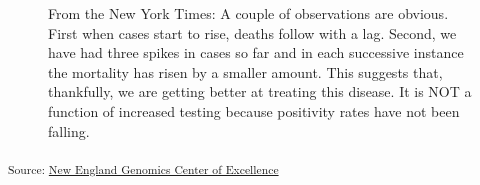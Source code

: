 \documentclass[
  twocolumn]{article}
\begin{document}
\begin{figure}[H]


\caption{\label{fig-state-analysis}From the New York Times: A couple of
observations are obvious. First when cases start to rise, deaths follow
with a lag. Second, we have had three spikes in cases so far and in each
successive instance the mortality has risen by a smaller amount. This
suggests that, thankfully, we are getting better at treating this
disease. It is NOT a function of increased testing because positivity
rates have not been falling.}

\end{figure}%

\textsubscript{Source:
\href{https://coe-test-org.github.io/sitrep-demo/notebooks/necoe-preview.html\#cell-fig-state-analysis}{New
England Genomics Center of Excellence}}
\end{document}

